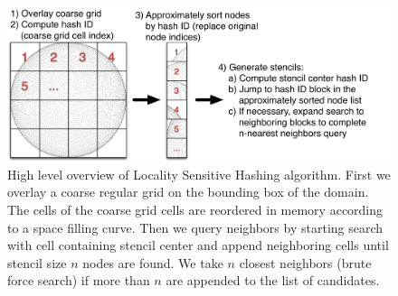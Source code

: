 
\begin{figure}
\centering
\includegraphics[width=1.0\textwidth]{figures/chapter7/LSH_Concept.png}
\caption{High level overview of Locality Sensitive Hashing algorithm. First we overlay a coarse regular grid on the bounding box of the domain. The cells of the coarse grid cells are reordered in memory according to a space filling curve. Then we query neighbors by starting search with  cell containing stencil center and append neighboring cells until stencil size $n$ nodes are found. We take $n$ closest neighbors (brute force search) if more than $n$ are appended to the list of candidates. }
\end{figure} 


